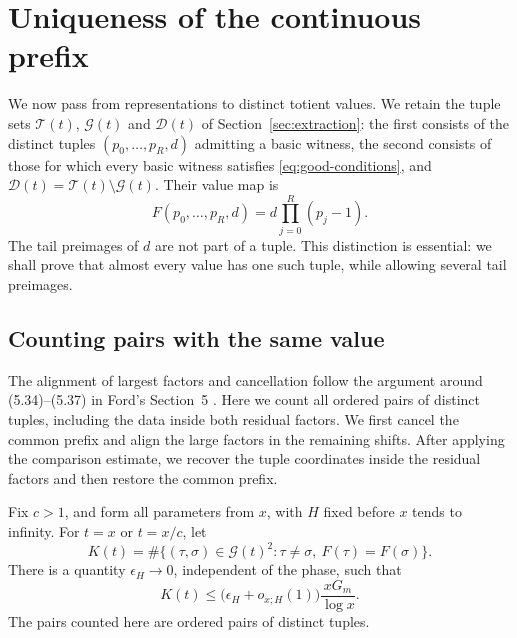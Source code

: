 \section{Uniqueness of the continuous prefix}\label{sec:collisions}

We now pass from representations to distinct totient values.  We retain the
tuple sets $\mathcal T(t)$, $\mathcal G(t)$ and $\mathcal D(t)$ of
Section~\ref{sec:extraction}: the first consists of the distinct tuples
$(p_0,\ldots,p_R,d)$ admitting a basic witness, the second consists of those
for which every basic witness satisfies \eqref{eq:good-conditions}, and
$\mathcal D(t)=\mathcal T(t)\setminus\mathcal G(t)$.  Their value map is
\[
 F(p_0,\ldots,p_R,d)=d\prod_{j=0}^R(p_j-1).
\]
The tail preimages of $d$ are not part of a tuple.  This distinction is
essential: we shall prove that almost every value has one such tuple,
while allowing several tail preimages.

\subsection{Counting pairs with the same value}
The alignment of largest factors and cancellation follow the argument
around (5.34)--(5.37) in Ford's Section~5 \cite{FordTotients2013}.
Here we count all ordered pairs of distinct tuples, including the data
inside both residual factors.
We first cancel the common prefix and align the large factors in the
remaining shifts. After applying the comparison estimate, we recover
the tuple coordinates inside the residual factors and then restore
the common prefix.

\begin{proposition}\label{prop:collisions}
Fix $c>1$, and form all parameters from $x$, with $H$ fixed before $x$
tends to infinity.  For $t=x$ or $t=x/c$, let
\[
 K(t)=\#\{(\tau,\sigma)\in\mathcal G(t)^2:
             \tau\ne\sigma,\ F(\tau)=F(\sigma)\}.
\]
There is a quantity $\epsilon_H\to0$, independent of the phase, such that
\[
 K(t)\le\bigl(\epsilon_H+o_{x;H}(1)\bigr)
                   \frac{xG_m}{\log x}.
\]
The pairs counted here are ordered pairs of distinct tuples.
\end{proposition}

